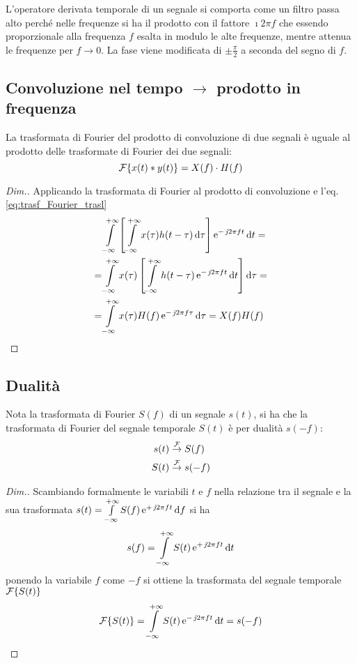 \begin{nota}
	L'operatore derivata temporale di un segnale si comporta come un filtro passa alto perché nelle frequenze si ha il prodotto con il fattore $\imath 2\pi f$ che essendo proporzionale alla frequenza $f$ esalta in modulo le alte frequenze, mentre attenua le frequenze per $f\to 0$. La fase viene modificata di $\pm\frac{\pi}{2}$ a seconda del segno di $f$.
\end{nota}

\subsection{Convoluzione nel tempo \texorpdfstring{$\to$}{come} prodotto in frequenza}
La trasformata di Fourier del prodotto di convoluzione di due segnali è uguale al prodotto delle trasformate di Fourier dei due segnali:
\begin{equation}
\label{eq:trasf_Fourier_conv}
	\operatorname{\mathcal{F}}\!\left\lbrace{x(t)\ast y(t)}\right\rbrace=X(f)\cdot H(f)
\end{equation}
\begin{proof}[Dim.]
Applicando la trasformata di Fourier al prodotto di convoluzione e l'eq.\ref{eq:trasf_Fourier_trasl}
\begin{align*}
	&\intinf{\left[\intinf{x(\tau)h(t-\tau)}{\tau}\right]\e{-\imath 2\pi f t}}{t}=\\
	=&\intinf{x(\tau)\left[\intinf{h(t-\tau)\e{-\imath 2\pi f t}}{t}\right]}{\tau}=\\
	=&\intinf{x(\tau)H(f)\e{-\imath 2\pi f \tau}}{\tau}=X(f)H(f)
\qedhere
\end{align*}
\end{proof}

\subsection{Dualità}
Nota la trasformata di Fourier $S(f)$ di un segnale $s(t)$, si ha che la trasformata di Fourier del segnale temporale $S(t)$ è per dualità $s(-f)$:
\begin{equation}
	\begin{split}
		s(t) &\overset{\operatorname{\mathcal{F}}}{\to} S(f) \\
		S(t) &\overset{\operatorname{\mathcal{F}}}{\to} s(-f)
	\end{split}
\end{equation}
\begin{proof}[Dim.]
Scambiando formalmente le variabili $t$ e $f$ nella relazione tra il segnale e la sua trasformata $s(t)=\int\limits_{-\infty}^{+\infty}{S(f)\operatorname{e}^{+\operatorname{\mathit{j}\!} 2\pi f t}}{\,\mathop{}\!\mathrm{d}{f}}$ si ha
\[
	s(f)=\int\limits_{-\infty}^{+\infty}{S(t)\operatorname{e}^{+\operatorname{\mathit{j}\!} 2\pi f t}}{\,\mathop{}\!\mathrm{d}{t}}
\]
ponendo la variabile $f$ come $-f$ si ottiene la trasformata del segnale temporale $\operatorname{\mathcal{F}}\!\left\lbrace{S(t)}\right\rbrace$
\[
	\operatorname{\mathcal{F}}\!\left\lbrace{S(t)}\right\rbrace=\int\limits_{-\infty}^{+\infty}{S(t)\operatorname{e}^{-\operatorname{\mathit{j}\!} 2\pi f t}}{\,\mathop{}\!\mathrm{d}{t}}=s(-f)
\qedhere
\]
\end{proof}

